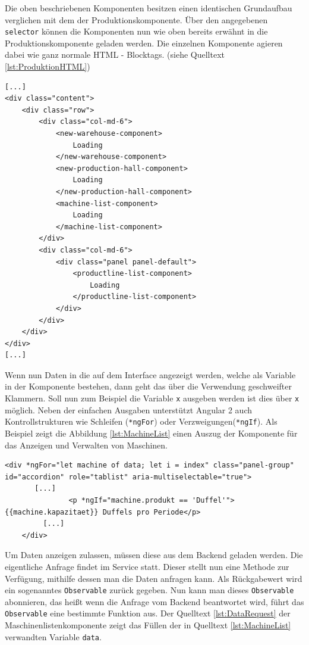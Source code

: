 Die oben beschriebenen Komponenten besitzen einen identischen Grundaufbau verglichen mit dem der Produktionskomponente. Über den angegebenen \texttt{selector} können die Komponenten nun wie oben bereits erwähnt in die Produktionskomponente geladen werden. Die einzelnen Komponente agieren dabei wie ganz normale HTML - Blocktags. (siehe Quelltext \ref{lst:ProduktionHTML})

\lstset{language=HTML}
\begin{lstlisting}[float=htbp, caption={Ausschnitt des Templates  der Produktionskomponente }, label={lst:ProduktionHTML}]
[...]
<div class="content">
	<div class="row">
		<div class="col-md-6">
			<new-warehouse-component>
				Loading
			</new-warehouse-component>
			<new-production-hall-component>
				Loading
			</new-production-hall-component>
			<machine-list-component>
				Loading
			</machine-list-component>
		</div>
		<div class="col-md-6">
			<div class="panel panel-default">
				<productline-list-component>
					Loading
				</productline-list-component>
			</div>
		</div>
	</div>
</div>
[...]
\end{lstlisting}

Wenn nun Daten in die auf dem Interface angezeigt werden, welche als Variable in der Komponente bestehen, dann geht das über die Verwendung geschweifter Klammern. Soll nun zum Beispiel die Variable \texttt{x} ausgeben werden ist dies über \texttt{{{x}}} möglich.
Neben der einfachen Ausgaben unterstützt Angular 2 auch Kontrollstrukturen wie Schleifen (\texttt{*ngFor}) oder Verzweigungen(\texttt{*ngIf}).
Als Beispiel zeigt die Abbildung \ref{lst:MachineList} einen Auszug der Komponente für das Anzeigen und Verwalten von Maschinen.

\lstset{language=HTML}
\begin{lstlisting}[float=htbp, caption={Beispiel für das Anzeigen von Daten in Angular}, label={lst:MachineList}]
   <div *ngFor="let machine of data; let i = index" class="panel-group" id="accordion" role="tablist" aria-multiselectable="true">
	   [...]
			   <p *ngIf="machine.produkt == 'Duffel'">{{machine.kapazitaet}} Duffels pro Periode</p>
		 [...]
	</div>
\end{lstlisting}

Um Daten anzeigen zulassen, müssen diese aus dem Backend geladen werden. Die eigentliche Anfrage findet im Service statt. Dieser stellt nun eine Methode zur Verfügung, mithilfe dessen man die Daten anfragen kann. Als Rückgabewert wird ein sogenanntes \texttt{Observable} zurück gegeben.
Nun kann man dieses \texttt{Observable} abonnieren, das heißt wenn die Anfrage vom Backend beantwortet wird, führt das \texttt{Observable} eine bestimmte Funktion aus. Der Quelltext \ref{lst:DataRequest} der Maschinenlistenkomponente zeigt das Füllen der in Quelltext \ref{lst:MachineList} verwandten Variable \texttt{data}.

